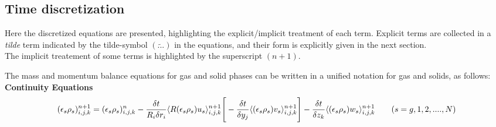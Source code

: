 \subsection{Time discretization}

Here the discretized equations are presented, highlighting the 
explicit/implicit treatment of each term.
Explicit terms are collected in a {\em tilde} term indicated by the 
tilde-symbol $(\widetilde{...})$ in the equations, and their form is 
explicitly given in the next section.\\
The implicit treatement of some terms is highlighted by the superscript $(n+1)$.

The mass and momentum balance equations for gas and solid phases can be written in a 
unified notation for gas and solids, as follows:\\

%
{\bf Continuity Equations}\\
%
\begin{eqnarray}
\htmlimage{}
(\epsilon_s \rho_s)_{i,j,k}^{n+1} = (\epsilon_s \rho_s)_{i,j,k}^{n} -
\frac{\delta t}{R_i \delta r_i} \langle R(\epsilon_s \rho_s) u_s \rangle_{i,j,k}^{n+1}
\Bigg[- \frac{\delta t}{\delta y_j} \langle (\epsilon_s \rho_s) v_s \rangle_{i,j,k}^{n+1}\Bigg]
- \frac{\delta t}{\delta z_k} \langle (\epsilon_s \rho_s) w_s \rangle_{i,j,k}^{n+1}
\qquad (s=g,1,2, ....,N)
\nonumber
\end{eqnarray}\\

